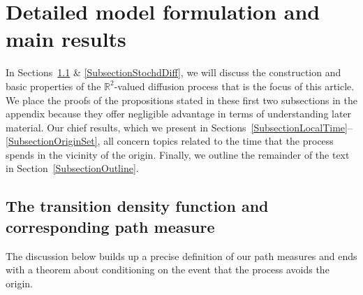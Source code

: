 \documentclass[10pt]{article}
\numberwithin{equation}{section}
\theoremstyle{definition}
\newcommand{\R}{{\mathbb R}}
\begin{document}
\section{Detailed model formulation and main results}  \label{SecMainResults} 
In Sections~\ref{SubSecTransProb} \& \ref{SubsectionStochdDiff}, we will discuss the construction and  basic properties of the $\R^2$-valued diffusion process that is the focus of this article.  We place the proofs of the propositions stated in these first two subsections in the appendix because they  offer negligible  advantage in terms of understanding later material.   Our chief results, which we present in Sections~\ref{SubsectionLocalTime}--\ref{SubsectionOriginSet}, all concern topics related to the time that the process spends in the vicinity of the origin.  Finally, we  outline the remainder of the text  in Section~\ref{SubsectionOutline}. 



\subsection{The transition density function and corresponding path measure}\label{SubSecTransProb}  
The discussion below  builds up  a precise definition of our path measures and ends with a  theorem about conditioning on  the event that the process avoids the origin.
 
\end{document}
